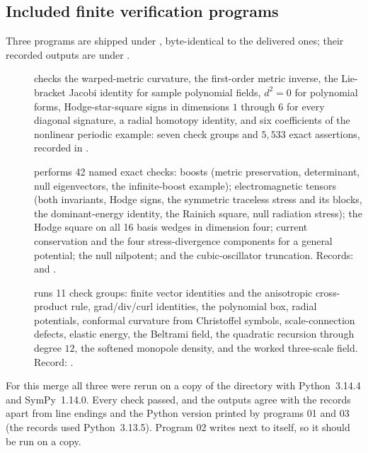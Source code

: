 \documentclass[11pt,letterpaper]{article}
\theoremstyle{definition}
\theoremstyle{remark}
\begin{document}
\subsection{Included finite verification programs}\label{vtf:subsec:verification}

Three programs are shipped under , byte-identical to the delivered
ones; their recorded outputs are under .
\begin{description}
\item[] checks the warped-metric
curvature, the first-order metric inverse, the Lie-bracket Jacobi identity for
sample polynomial fields, $d^2=0$ for polynomial forms, Hodge-star-square signs
in dimensions $1$ through $6$ for every diagonal signature, a radial homotopy
identity, and six coefficients of the nonlinear periodic example: seven check
groups and $5{,}533$ exact assertions, recorded in
.
\item[] performs 42 named exact
checks: boosts (metric preservation, determinant, null eigenvectors, the
infinite-boost example); electromagnetic tensors (both invariants, Hodge signs,
the symmetric traceless stress and its blocks, the dominant-energy identity, the
Rainich square, null radiation stress); the Hodge square on all 16 basis wedges
in dimension four; current conservation and the four stress-divergence
components for a general potential; the null nilpotent; and the cubic-oscillator
truncation. Records:  and
.
\item[] runs 11 check
groups: finite vector identities and the anisotropic cross-product rule,
grad/div/curl identities, the polynomial box, radial potentials, conformal
curvature from Christoffel symbols, scale-connection defects, elastic energy,
the Beltrami field, the quadratic recursion through degree $12$, the softened
monopole density, and the worked three-scale field. Record:
.
\end{description}
For this merge all three were rerun on a copy of the directory with
Python~3.14.4 and SymPy~1.14.0. Every check passed, and the outputs agree with the
records apart from line endings and the Python version printed by programs 01
and 03 (the records used Python~3.13.5). Program 02 writes
 next to itself, so it should be run on a copy.
\end{document}
